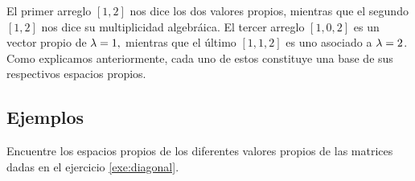 El primer arreglo $[1,2]$ nos dice los dos valores propios, mientras que el segundo $[1,2]$ nos dice su multiplicidad
algebráica. El tercer arreglo $[1,0,2]$ es un vector propio de $\lambda=1,$ mientras que el último $[1,1,2]$ es uno
asociado a $\lambda=2$. Como explicamos anteriormente, cada uno de estos constituye una base de sus respectivos espacios
propios.

\subsection*{Ejemplos}

\begin{problema}
 Encuentre los espacios propios de los diferentes valores propios de las matrices dadas en el ejercicio
 \ref{exe:diagonal}.
\end{problema}

